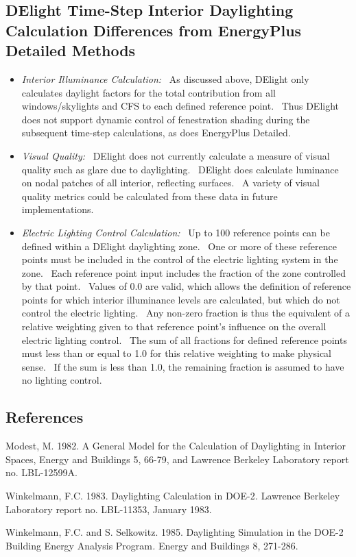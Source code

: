 \subsection{DElight Time-Step Interior Daylighting Calculation Differences from EnergyPlus Detailed Methods}\label{delight-time-step-interior-daylighting-calculation-differences-from-energyplus-detailed-methods}

\begin{itemize}
\item
  \emph{Interior Illuminance Calculation:}~ As discussed above, DElight only calculates daylight factors for the total contribution from all windows/skylights and CFS to each defined reference point.~ Thus DElight does not support dynamic control of fenestration shading during the subsequent time-step calculations, as does EnergyPlus Detailed.
\item
  \emph{Visual Quality:}~ DElight does not currently calculate a measure of visual quality such as glare due to daylighting.~ DElight does calculate luminance on nodal patches of all interior, reflecting surfaces.~ A variety of visual quality metrics could be calculated from these data in future implementations.
\item
  \emph{Electric Lighting Control Calculation:}~ Up to 100 reference points can be defined within a DElight daylighting zone.~ One or more of these reference points must be included in the control of the electric lighting system in the zone.~ Each reference point input includes the fraction of the zone controlled by that point.~ Values of 0.0 are valid, which allows the definition of reference points for which interior illuminance levels are calculated, but which do not control the electric lighting.~ Any non-zero fraction is thus the equivalent of a relative weighting given to that reference point's influence on the overall electric lighting control.~ The sum of all fractions for defined reference points must less than or equal to 1.0 for this relative weighting to make physical sense.~ If the sum is less than 1.0, the remaining fraction is assumed to have no lighting control.
\end{itemize}

\subsection{References}\label{references-017}

Modest, M. 1982. A General Model for the Calculation of Daylighting in Interior Spaces, Energy and Buildings 5, 66-79, and Lawrence Berkeley Laboratory report no. LBL-12599A.

Winkelmann, F.C. 1983. Daylighting Calculation in DOE-2\emph{.} Lawrence Berkeley Laboratory report no. LBL-11353, January 1983.

Winkelmann, F.C. and S. Selkowitz. 1985. Daylighting Simulation in the DOE-2 Building Energy Analysis Program\emph{.} Energy and Buildings 8, 271-286.
